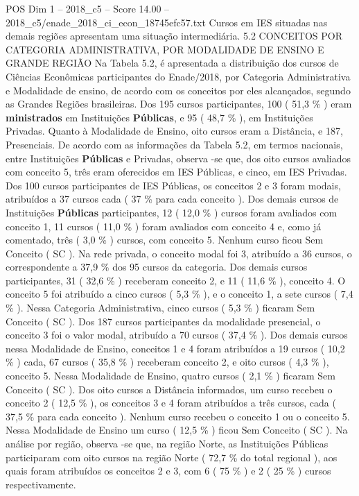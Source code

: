 \begin{textsample}{POS Dim 1 – 2018\_c5 – Score 14.00 – 2018\_c5/enade\_2018\_ci\_econ\_18745efc57.txt}
Cursos em IES situadas nas demais regiões apresentam uma situação intermediária. 5.2 CONCEITOS POR CATEGORIA ADMINISTRATIVA, POR MODALIDADE DE ENSINO E GRANDE REGIÃO Na Tabela 5.2, é apresentada a distribuição dos cursos de Ciências Econômicas participantes do Enade/2018, por Categoria Administrativa e Modalidade de ensino, de acordo com os conceitos por eles alcançados, segundo as Grandes Regiões brasileiras.
Dos 195 cursos participantes, 100 ( 51,3 \% ) eram \textbf{ministrados} em Instituições \textbf{Públicas}, e 95 ( 48,7 \% ), em Instituições Privadas.
Quanto à Modalidade de Ensino, oito cursos eram a Distância, e 187, Presenciais.
De acordo com as informações da Tabela 5.2, em termos nacionais, entre Instituições \textbf{Públicas} e Privadas, observa -se que, dos oito cursos avaliados com conceito 5, três eram oferecidos em IES Públicas, e cinco, em IES Privadas.
Dos 100 cursos participantes de IES Públicas, os conceitos 2 e 3 foram modais, atribuídos a 37 cursos cada ( 37 \% para cada conceito ).
Dos demais cursos de Instituições \textbf{Públicas} participantes, 12 ( 12,0 \% ) cursos foram avaliados com conceito 1, 11 cursos ( 11,0 \% ) foram avaliados com conceito 4 e, como já comentado, três ( 3,0 \% ) cursos, com conceito 5.
Nenhum curso ficou Sem Conceito ( SC ).
Na rede privada, o conceito modal foi 3, atribuído a 36 cursos, o correspondente a 37,9 \% dos 95 cursos da categoria.
Dos demais cursos participantes, 31 ( 32,6 \% ) receberam conceito 2, e 11 ( 11,6 \% ), conceito 4.
O conceito 5 foi atribuído a cinco cursos ( 5,3 \% ), e o conceito 1, a sete cursos ( 7,4 \% ).
Nessa Categoria Administrativa, cinco cursos ( 5,3 \% ) ficaram Sem Conceito ( SC ).
Dos 187 cursos participantes da modalidade presencial, o conceito 3 foi o valor modal, atribuído a 70 cursos ( 37,4 \% ).
Dos demais cursos nessa Modalidade de Ensino, conceitos 1 e 4 foram atribuídos a 19 cursos ( 10,2 \% ) cada, 67 cursos ( 35,8 \% ) receberam conceito 2, e oito cursos ( 4,3 \% ), conceito 5.
Nessa Modalidade de Ensino, quatro cursos ( 2,1 \% ) ficaram Sem Conceito ( SC ).
Dos oito cursos a Distância informados, um curso recebeu o conceito 2 ( 12,5 \% ), os conceitos 3 e 4 foram atribuídos a três cursos, cada ( 37,5 \% para cada conceito ).
Nenhum curso recebeu o conceito 1 ou o conceito 5.
Nessa Modalidade de Ensino um curso ( 12,5 \% ) ficou Sem Conceito ( SC ).
Na análise por região, observa -se que, na região Norte, as Instituições Públicas participaram com oito cursos na região Norte ( 72,7 \% do total regional ), aos quais foram atribuídos os conceitos 2 e 3, com 6 ( 75 \% ) e 2 ( 25 \% ) cursos respectivamente.

\end{textsample}
